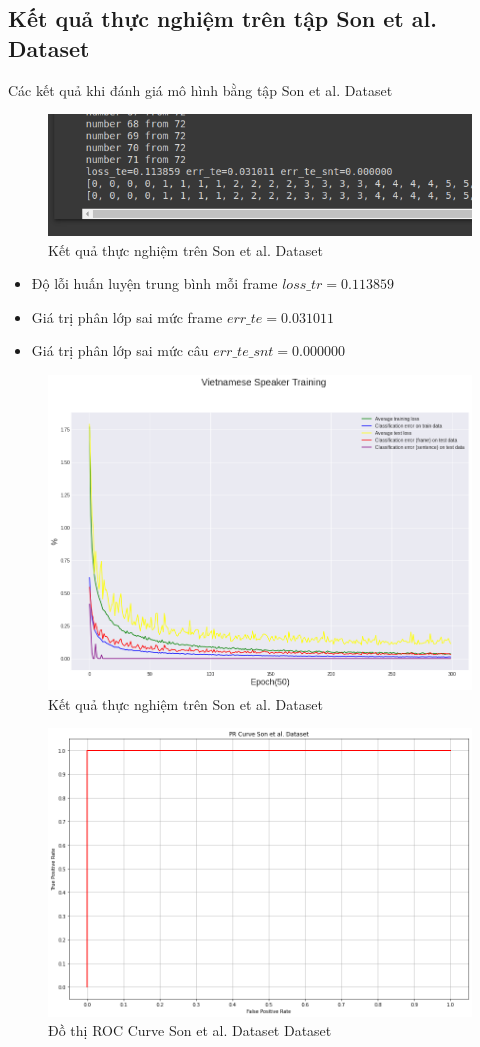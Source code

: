 \documentclass{article}
\begin{document}
	\subsection{Kết quả thực nghiệm trên tập Son et al. Dataset}
	Các kết quả khi đánh giá mô hình bằng tập Son et al. Dataset
	\begin{figure}[H]
		\centering
		\includegraphics[width=.75\textwidth]{result/evaluate_result_vn_speaker.png}
		\caption{Kết quả thực nghiệm trên Son et al. Dataset}
		\label{fig:writing-thesis}
	\end{figure}
	\begin{itemize}
		\item Độ lỗi huấn luyện trung bình mỗi frame $loss\_tr=0.113859$
		\item Giá trị phân lớp sai mức frame $err\_te=0.031011$
		\item Giá trị phân lớp sai mức câu $err\_te\_snt =0.000000$
	\end{itemize}
	\begin{figure}[H]
		\centering
		\includegraphics[width=.75\textwidth]{result/sincnet_vietnamese_plot.png}
		\caption{Kết quả thực nghiệm trên Son et al. Dataset}
		\label{fig:writing-thesis}
	\end{figure}
	\begin{figure}[H]
		\centering
		\includegraphics[width=.75\textwidth]{result/roc_curve_vietnamese.png}
		\caption{Đồ thị ROC Curve Son et al. Dataset Dataset}
		\label{fig:writing-thesis}
	\end{figure}
\end{document}
